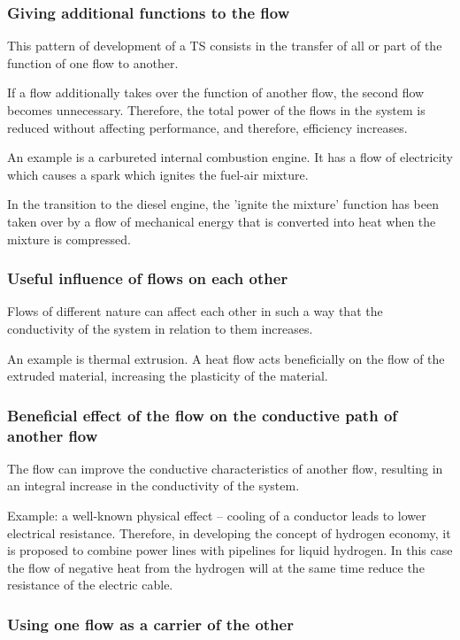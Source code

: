 \documentclass[a4paper,11pt]{article}
\begin{document}
\subsubsection{Giving additional functions to the flow}

This pattern of development of a TS consists in the transfer of all or part of
the function of one flow to another.

If a flow additionally takes over the function of another flow, the second
flow becomes unnecessary. Therefore, the total power of the flows in the
system is reduced without affecting performance, and therefore, efficiency
increases.

An example is a carbureted internal combustion engine. It has a flow of
electricity which causes a spark which ignites the fuel-air mixture.

In the transition to the diesel engine, the 'ignite the mixture' function has
been taken over by a flow of mechanical energy that is converted into heat
when the mixture is compressed.

\subsubsection{Useful influence of flows on each other}

Flows of different nature can affect each other in such a way that the
conductivity of the system in relation to them increases.

An example is thermal extrusion. A heat flow acts beneficially on the flow of
the extruded material, increasing the plasticity of the material.

\subsubsection{Beneficial effect of the flow on the conductive path of another
  flow} 

The flow can improve the conductive characteristics of another flow, resulting
in an integral increase in the conductivity of the system.

Example: a well-known physical effect -- cooling of a conductor leads to lower
electrical resistance. Therefore, in developing the concept of hydrogen
economy, it is proposed to combine power lines with pipelines for liquid
hydrogen.  In this case the flow of negative heat from the hydrogen will at
the same time reduce the resistance of the electric cable.

\subsubsection{Using one flow as a carrier of the other}
\end{document}
